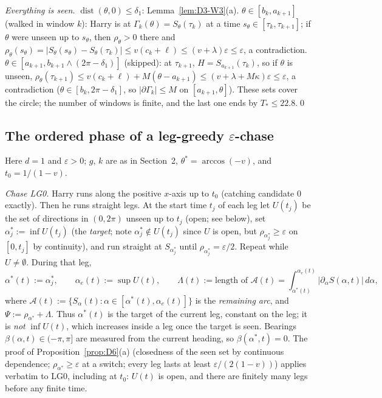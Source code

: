 \emph{Everything is seen.} $\operatorname{dist}(\theta,0)\le\delta_1$: Lemma~\ref{lem:D3-W3}(a). $\theta\in[b_k,a_{k+1}]$ (walked in
window $k$): Harry is at $\Gamma_k(\theta)=S_\theta(\tau_k)$ at a time $s_\theta\in[\tau_k,\tau_{k+1}]$; if $\theta$ were unseen up to
$s_\theta$, then $\rho_\theta>0$ there and $\rho_\theta(s_\theta)=|S_\theta(s_\theta)-S_\theta(\tau_k)|\le v(c_k+\ell)\le(v+\lambda)\varepsilon\le\varepsilon$,
a contradiction. $\theta\in[a_{k+1},b_{k+1}\wedge(2\pi-\delta_1)]$ (skipped): at $\tau_{k+1}$, $H=S_{a_{k+1}}(\tau_k)$, so if $\theta$ is
unseen, $\rho_\theta(\tau_{k+1})\le v(c_k+\ell)+M(\theta-a_{k+1})\le(v+\lambda+M\kappa)\varepsilon\le\varepsilon$, a contradiction
($\theta\in[b_k,2\pi-\delta_1]$, so $|\partial\Gamma_k|\le M$ on $[a_{k+1},\theta]$). These sets cover the circle; the number of
windows is finite, and the last one ends by $T_*\le22.8$.\qed

\subsection{The ordered phase of a leg-greedy \texorpdfstring{$\varepsilon$}{epsilon}-chase}\label{sec:D3-chase}
Here $d=1$ and $\varepsilon>0$; $g$, $k$ are as in Section~2, $\theta^*=\arccos(-v)$, and $t_0=1/(1-v)$.

\emph{Chase LG0.} Harry runs along the positive $x$-axis up to $t_0$ (catching candidate $0$ exactly). Then he runs straight
legs. At the start time $t_j$ of each leg let $U(t_j)$ be the set of directions in $(0,2\pi)$ unseen up to $t_j$ (open; see below),
set $\alpha^*_j:=\inf U(t_j)$ (the \emph{target}; note $\alpha^*_j\notin U(t_j)$ since $U$ is open, but
$\rho_{\alpha^*_j}\ge\varepsilon$ on $[0,t_j]$ by continuity), and run straight at $S_{\alpha^*_j}$ until
$\rho_{\alpha^*_j}=\varepsilon/2$. Repeat while $U\ne\emptyset$. During that leg,
\[
\alpha^*(t):=\alpha^*_j,\qquad \alpha_e(t):=\sup U(t),\qquad
\Lambda(t):=\text{length of }\mathcal A(t)=\int_{\alpha^*(t)}^{\alpha_e(t)}|\partial_\alpha S(\alpha,t)|\,d\alpha,
\]
where $\mathcal A(t):=\{S_\alpha(t):\alpha\in[\alpha^*(t),\alpha_e(t)]\}$ is the \emph{remaining arc}, and $\Psi:=\rho_{\alpha^*}+\Lambda$.
Thus $\alpha^*(t)$ is the target of the current leg, constant on the leg; it is \emph{not} $\inf U(t)$, which increases inside a leg
once the target is seen. Bearings $\beta(\alpha,t)\in(-\pi,\pi]$ are measured from the current heading, so $\beta(\alpha^*,t)=0$.
The proof of Proposition~\ref{prop:D6}(a) (closedness of the seen set by continuous dependence; $\rho_{\alpha^*}\ge\varepsilon$ at a
switch; every leg lasts at least $\varepsilon/(2(1-v))$) applies verbatim to LG0, including at $t_0$: $U(t)$ is open, and there are
finitely many legs before any finite time.

